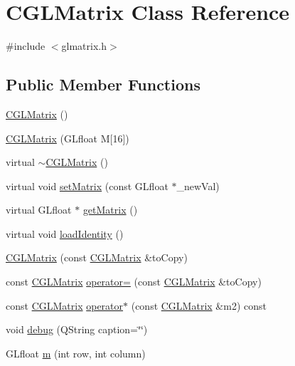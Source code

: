 \hypertarget{classCGLMatrix}{
\section{\-C\-G\-L\-Matrix \-Class \-Reference}
\label{d2/dbf/classCGLMatrix}
}


{\ttfamily \#include $<$glmatrix.\-h$>$}

\subsection*{\-Public \-Member \-Functions}
\begin{DoxyCompactItemize}
\item 
\hyperlink{classCGLMatrix_ab2ad5981adacfea9323c4cf892831963}{\-C\-G\-L\-Matrix} ()
\item 
\hyperlink{classCGLMatrix_a3732be240d673831d771617653dafe85}{\-C\-G\-L\-Matrix} (\-G\-Lfloat \-M\mbox{[}16\mbox{]})
\item 
virtual \hyperlink{classCGLMatrix_af11bc8cfebec11bd52020972d8f086c5}{$\sim$\-C\-G\-L\-Matrix} ()
\item 
virtual void \hyperlink{classCGLMatrix_a737261c154aa5a703bfa3cf498fffe05}{set\-Matrix} (const \-G\-Lfloat $\ast$\-\_\-new\-Val)
\item 
virtual \-G\-Lfloat $\ast$ \hyperlink{classCGLMatrix_aebb017fd4ab60e03894c8e3145238079}{get\-Matrix} ()
\item 
virtual void \hyperlink{classCGLMatrix_a09af9dead3620cdbe1457b77cf5f0d1d}{load\-Identity} ()
\item 
\hyperlink{classCGLMatrix_a74b6777abe679abe7f6cc4a18293e08a}{\-C\-G\-L\-Matrix} (const \hyperlink{classCGLMatrix}{\-C\-G\-L\-Matrix} \&to\-Copy)
\item 
const \hyperlink{classCGLMatrix}{\-C\-G\-L\-Matrix} \hyperlink{classCGLMatrix_a0570cbcf3bfc884c8ff5a76664f8fd1c}{operator=} (const \hyperlink{classCGLMatrix}{\-C\-G\-L\-Matrix} \&to\-Copy)
\item 
const \hyperlink{classCGLMatrix}{\-C\-G\-L\-Matrix} \hyperlink{classCGLMatrix_aafd7dd919dd8762157a305b1cd66a9c5}{operator$\ast$} (const \hyperlink{classCGLMatrix}{\-C\-G\-L\-Matrix} \&m2) const 
\item 
void \hyperlink{classCGLMatrix_adc9981a6db8d0a61a4cdf07560a5a0e6}{debug} (\-Q\-String caption=\char`\"{}\char`\"{})
\item 
\-G\-Lfloat \hyperlink{classCGLMatrix_a977b113879f078d72451a35b8a5870ee}{m} (int row, int column)
\item 

\end{DoxyCompactItemize}
